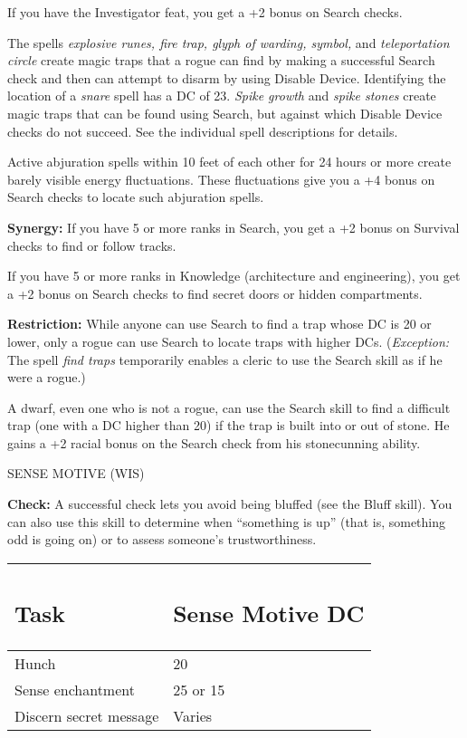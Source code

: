 \documentclass{article}
\begin{document}
If you have the Investigator feat, you get a +2 bonus on Search checks.

The spells \textit{explosive runes, fire trap, glyph of warding, symbol, }and \textit{teleportation 
circle }create magic traps that a rogue can find by making a successful Search 
check and then can attempt to disarm by using Disable Device. Identifying the location 
of a \textit{snare }spell has a DC of 23. \textit{Spike growth }and \textit{spike 
stones }create magic traps that can be found using Search, but against which Disable 
Device checks do not succeed. See the individual spell descriptions for details.

Active abjuration spells within 10 feet of each other for 24 hours or more create 
barely visible energy fluctuations. These fluctuations give you a +4 bonus on Search 
checks to locate such abjuration spells.

\textbf{Synergy:} If you have 5 or more ranks in Search, you get a +2 bonus on 
Survival checks to find or follow tracks.

If you have 5 or more ranks in Knowledge (architecture and engineering), you get 
a +2 bonus on Search checks to find secret doors or hidden compartments.

\textbf{Restriction:} While anyone can use Search to find a trap whose DC is 20 
or lower, only a rogue can use Search to locate traps with higher DCs. (\textit{Exception: 
}The spell \textit{find traps }temporarily enables a cleric to use the Search skill 
as if he were a rogue.)

A dwarf, even one who is not a rogue, can use the Search skill to find a difficult 
trap (one with a DC higher than 20) if the trap is built into or out of stone. 
He gains a +2 racial bonus on the Search check from his stonecunning ability.

\vspace{12pt}
SENSE MOTIVE (WIS)

\textbf{Check:} A successful check lets you avoid being bluffed (see the Bluff 
skill). You can also use this skill to determine when ``something is up'' (that 
is, something odd is going on) or to assess someone's trustworthiness. 

\vspace{12pt}
\begin{tabular}{|>{\raggedright}p{92pt}|>{\raggedright}p{72pt}|}
\hline
\subsection*{T\textbf{ask }} & \subsection*{S\textbf{ense Motive DC}}\tabularnewline
\hline
Hunch  & 20\tabularnewline
\hline
Sense enchantment  & 25 or 15\tabularnewline
\hline
Discern secret message  & Varies\tabularnewline
\hline
\end{tabular}
\end{document}
